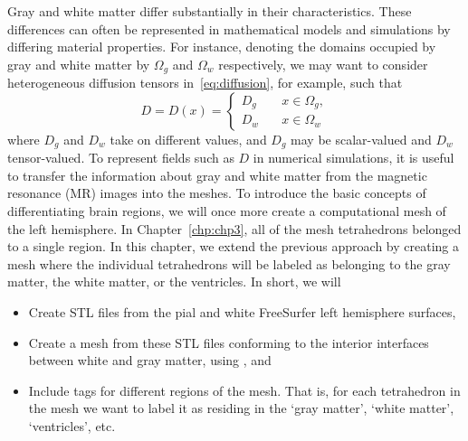Gray and white matter differ substantially in their
characteristics. These differences can often be represented in
mathematical models and simulations by differing material
properties. For instance, denoting the domains occupied by gray and
white matter by $\Omega_g$ and $\Omega_w$ respectively, we may want to
consider heterogeneous diffusion tensors in~\eqref{eq:diffusion}, for
example, such that
\begin{equation}
  \label{eq:K}
  D = D(x) = \left \{
    \begin{matrix}
      D_g & \quad x \in \Omega_g, \\
      D_w & \quad x \in \Omega_w 
    \end{matrix}
    \right .
\end{equation}
where $D_g$ and $D_w$ take on different values, and $D_g$ may be
scalar-valued and $D_w$ tensor-valued. To represent fields such as $D$
in numerical simulations, it is useful to transfer the information
about gray and white matter from the magnetic resonance (MR) images
into the meshes. To introduce the basic concepts of differentiating
brain regions, we will once more create a computational mesh of the left
hemisphere.  In Chapter~\ref{chp:chp3}, all of the mesh tetrahedrons belonged 
to a single region.  In this chapter, we extend the previous approach 
by creating a mesh where the individual tetrahedrons will be labeled as 
belonging to the gray matter, the white matter, or the ventricles. In short, 
we will
\begin{itemize}
\item
  Create STL files from the pial and white FreeSurfer left hemisphere
  surfaces, 
\item
  Create a mesh from these STL files conforming to the interior interfaces
  between white and gray matter, using \svmtk{}, and
\item
  Include tags for different regions of the mesh.  That is, for each 
  tetrahedron in the mesh we want to label it as residing in the 
  `gray matter', `white matter', `ventricles', etc.     
\end{itemize}

